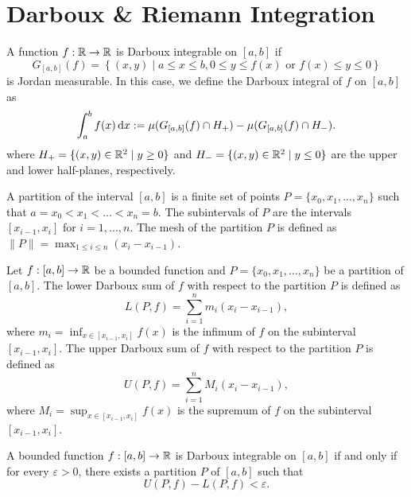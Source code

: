 \section{Darboux \& Riemann Integration}

\begin{definition}
    A function $f:\mathbb{R}\to\mathbb{R}$ is Darboux integrable on $[a,b]$ if 
    \[
        G_{[a,b]}(f) = \left\{(x,y) \mid a\le x \le b, 0\le y \le f(x) \text{ or } f(x) \le y \le 0 \right\}
    \] 
    is Jordan measurable. In this case, we define the Darboux integral of $f$ on $[a,b]$ as
    \[
        \int_a^b f(x) \operatorname*{d\!} x := \mu(G_{[a,b]}(f)\cap H_+) - \mu(G_{[a,b]}(f)\cap H_-).
    \]
    where $H_+ = \{(x,y) \in \mathbb{R}^2 \mid y\ge 0\}$ and $H_- = \{(x,y) \in \mathbb{R}^2 \mid y\le 0\}$ are the upper and lower half-planes, respectively.
\end{definition}

\begin{definition} 
    A partition of the interval $[a,b]$ is a finite set of points $P = \{x_0,x_1,...,x_n\}$ such that $a = x_0 < x_1 < ... < x_n = b$. The subintervals of $P$ are the intervals $[x_{i-1},x_i]$ for $i=1,...,n$. The mesh of the partition $P$ is defined as $\|P\| = \displaystyle\max_{1\le i \le n} (x_i - x_{i-1})$.
\end{definition}

\begin{definition} 
    Let $f:[a,b]\to\mathbb{R}$ be a bounded function and $P = \{x_0,x_1,...,x_n\}$ be a partition of $[a,b]$. The lower Darboux sum of $f$ with respect to the partition $P$ is defined as
    \[
        L(P,f) = \sum_{i=1}^n m_i (x_i - x_{i-1}),
    \]
    where $m_i = \displaystyle\inf_{x\in[x_{i-1},x_i]} f(x)$ is the infimum of $f$ on the subinterval $[x_{i-1},x_i]$. The upper Darboux sum of $f$ with respect to the partition $P$ is defined as
    \[
        U(P,f) = \sum_{i=1}^n M_i (x_i - x_{i-1}),
    \]
    where $M_i = \displaystyle\sup_{x\in[x_{i-1},x_i]} f(x)$ is the supremum of $f$ on the subinterval $[x_{i-1},x_i]$.
\end{definition}

\begin{theorem} 
    A bounded function $f:[a,b]\to\mathbb{R}$ is Darboux integrable on $[a,b]$ if and only if for every $\varepsilon > 0$, there exists a partition $P$ of $[a,b]$ such that
    \[
        U(P,f) - L(P,f) < \varepsilon.
    \]
\end{theorem}

